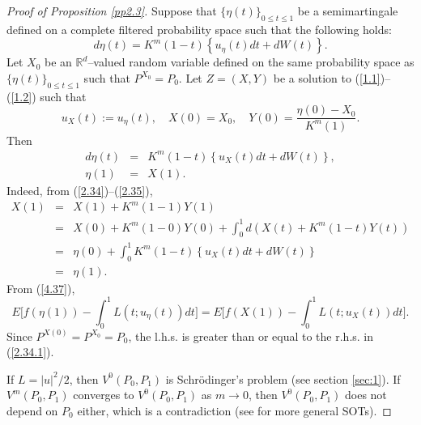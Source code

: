 \documentclass[12pt]{article}
\begin{document}
\begin{proof}[Proof of Proposition \ref{pp2.3}]
Suppose that $\{\eta (t)\}_{0\le t\le 1}$ be a semimartingale defined on a complete filtered probability space such that the following holds:
\begin{equation}
d\eta (t)=K^m(1-t)\left\{u_\eta(t)dt+dW(t)\right\}.%
\end{equation}
Let $X_0$  be an $\mathbb{R}^d$--valued random variable defined
on the same probability space as  $\{\eta (t)\}_{0\le t\le 1}$ such that $P^{X_0}=P_0$.
Let $Z=(X,Y)$ be a solution to (\ref{1.1})--(\ref{1.2}) such that 
$$
u_X(t):=u_\eta(t),\quad X(0)=X_0, \quad Y(0)=\frac{\eta(0)-X_0}{K^m(1)}.$$
Then
\begin{eqnarray}
d\eta (t)&=&K^m(1-t)\left\{u_X(t)dt+dW(t)\right\},\label{4.37}\\
\eta(1)&=&X(1).\nonumber
\end{eqnarray}
Indeed, from (\ref{2.34})--(\ref{2.35}), 
\begin{eqnarray*}
X(1)&=&X(1)+K^m(1-1)Y(1)\\
&=&X(0)+K^m(1-0)Y(0)
+\int_0^1 d(X(t)+K^m(1-t)Y(t))\\
&=&\eta(0)+\int_0^1 K^m(1-t)\left\{u_X(t)dt+dW(t)\right\}\\
&=&\eta(1).
\end{eqnarray*}
From (\ref{4.37}),
\begin{equation}
E\biggl[f(\eta (1))-\int_0^1 L(t;u_\eta(t))dt \biggr]
=E\biggl[f(X (1))-\int_0^1 L(t;u_X(t))dt \biggr].
\end{equation}
Since $P^{X(0)}=P^{X_0}=P_0$,
the l.h.s. is greater than or equal to the r.h.s. in  (\ref{2.34.1}).

If $L=|u|^2/2$, then $V^0(P_0,P_1)$ is Schr\"odinger's problem  (see section \ref{sec:1}).
If $V^m(P_0,P_1)$  converges to $V^0(P_0,P_1)$ as $m\to 0$,
then $V^0(P_0,P_1)$ does not depend on $P_0$ either, which is a contradiction
 (see \cite{M2021} for more general SOTs).
 
\end{proof}
\end{document}
